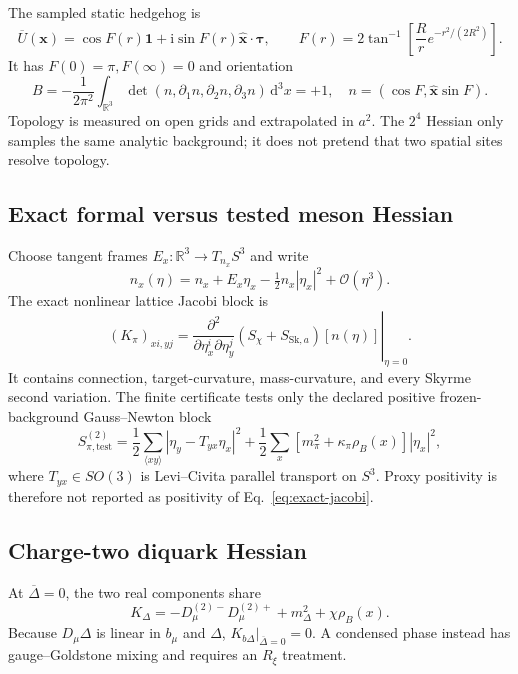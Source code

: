 \documentclass[11pt]{article}
\theoremstyle{definition}
\theoremstyle{remark}
\newcommand{\ii}{\mathrm i}
\newcommand{\RR}{\mathbb R}
\begin{document}
The sampled static hedgehog is
\begin{equation}
 \overline U(\bm x)=\cos F(r)\mathbf1+
 \ii\sin F(r)\widehat{\bm x}\cdot\bm\tau,\qquad
 F(r)=2\tan^{-1}\left[\frac Rr e^{-r^2/(2R^2)}\right].
 \label{eq:hedgehog}
\end{equation}
It has \(F(0)=\pi,F(\infty)=0\) and orientation
\begin{equation}
 B=-\frac1{2\pi^2}\int_{\RR^3}
 \det(n,\partial_1n,\partial_2n,\partial_3n)\,\mathrm d^3x=+1,
 \quad n=(\cos F,\widehat{\bm x}\sin F).
 \label{eq:baryon}
\end{equation}
Topology is measured on open grids and extrapolated in \(a^2\).  The
\(2^4\) Hessian only samples the same analytic background; it does not
pretend that two spatial sites resolve topology.

\subsection{Exact formal versus tested meson Hessian}

Choose tangent frames \(E_x:\RR^3\to T_{n_x}S^3\) and write
\[
 n_x(\eta)=n_x+E_x\eta_x-\tfrac12n_x|\eta_x|^2+\mathcal O(\eta^3).
\]
The exact nonlinear lattice Jacobi block is
\begin{equation}
 (K_\pi)_{xi,yj}
 =\left.\frac{\partial^2}{\partial\eta_x^i\partial\eta_y^j}
 (S_\chi+S_{\mathrm{Sk},a})[n(\eta)]\right|_{\eta=0}.
 \label{eq:exact-jacobi}
\end{equation}
It contains connection, target-curvature, mass-curvature, and every Skyrme
second variation.  The finite certificate tests only the declared positive
frozen-background Gauss--Newton block
\begin{equation}
 S_{\pi,\mathrm{test}}^{(2)}
 =\frac12\sum_{\langle xy\rangle}|\eta_y-T_{yx}\eta_x|^2
 +\frac12\sum_x[m_\pi^2+\kappa_\pi\rho_B(x)]|\eta_x|^2,
 \label{eq:meson-test}
\end{equation}
where \(T_{yx}\in SO(3)\) is Levi--Civita parallel transport on \(S^3\).
Proxy positivity is therefore not reported as positivity of
Eq.~\eqref{eq:exact-jacobi}.

\subsection{Charge-two diquark Hessian}

At \(\overline\Delta=0\), the two real components share
\begin{equation}
 K_\Delta=-D_\mu^{(2)-}D_\mu^{(2)+}
 +m_\Delta^2+\chi\rho_B(x).
 \label{eq:diquark}
\end{equation}
Because \(D_\mu\Delta\) is linear in \(b_\mu\) and \(\Delta\),
\(K_{b\Delta}|_{\overline\Delta=0}=0\).  A condensed phase instead has
gauge--Goldstone mixing and requires an \(R_\xi\) treatment.
\end{document}
